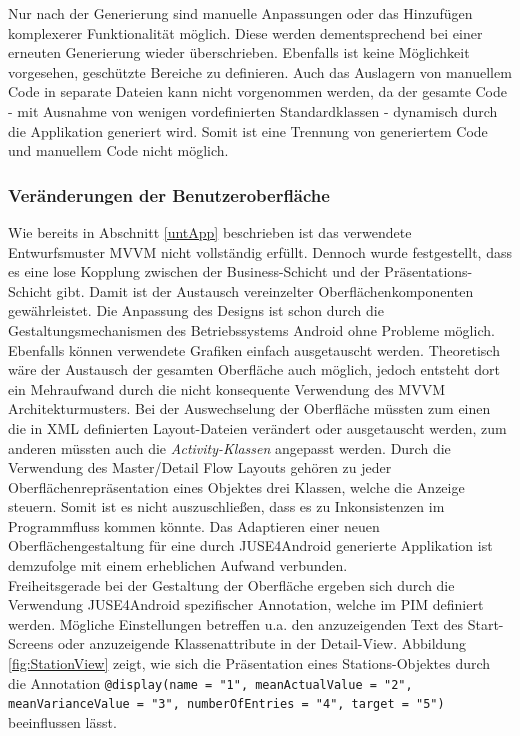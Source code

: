 \documentclass[a4paper,twoside]{article}
\begin{document}
Nur nach der Generierung sind manuelle Anpassungen oder das Hinzufügen komplexerer Funktionalität möglich. Diese werden dementsprechend bei einer erneuten Generierung wieder überschrieben. Ebenfalls ist keine Möglichkeit vorgesehen, geschützte Bereiche zu definieren. Auch das Auslagern von manuellem Code in separate Dateien kann nicht vorgenommen werden, da der gesamte Code - mit Ausnahme von wenigen vordefinierten Standardklassen - dynamisch durch die Applikation generiert wird. Somit ist eine Trennung von generiertem Code und manuellem Code nicht möglich. 

\subsubsection{Veränderungen der Benutzeroberfläche}
Wie bereits in Abschnitt \ref{untApp} beschrieben ist das verwendete Entwurfsmuster MVVM nicht vollständig erfüllt. Dennoch wurde festgestellt, dass es eine lose Kopplung zwischen der Business-Schicht und der Präsentations-Schicht gibt. Damit ist der Austausch vereinzelter Oberflächenkomponenten gewährleistet. Die Anpassung des Designs ist schon durch die Gestaltungsmechanismen des Betriebssystems Android ohne Probleme möglich. Ebenfalls können verwendete Grafiken einfach ausgetauscht werden. Theoretisch wäre der Austausch der gesamten Oberfläche auch möglich, jedoch entsteht dort ein Mehraufwand durch die nicht konsequente Verwendung des MVVM Architekturmusters. Bei der Auswechselung der Oberfläche müssten zum einen die in XML definierten Layout-Dateien verändert oder ausgetauscht werden, zum anderen müssten auch die \textit{Activity-Klassen} angepasst werden. Durch die Verwendung des Master/Detail Flow Layouts gehören zu jeder Oberflächenrepräsentation eines Objektes drei Klassen, welche die Anzeige steuern. Somit ist es nicht auszuschließen, dass es zu Inkonsistenzen im Programmfluss kommen könnte. Das Adaptieren einer neuen Oberflächengestaltung für eine durch JUSE4Android generierte Applikation ist demzufolge mit einem erheblichen Aufwand verbunden.\\
Freiheitsgerade bei der Gestaltung der Oberfläche ergeben sich durch die Verwendung JUSE4Android spezifischer Annotation, welche im PIM definiert werden. Mögliche Einstellungen betreffen u.a. den anzuzeigenden Text des Start-Screens oder anzuzeigende Klassenattribute in der Detail-View. \cite[S.19]{SilvaMasterThesis} Abbildung \ref{fig:StationView} zeigt, wie sich die Präsentation eines Stations-Objektes durch die Annotation \texttt{@display(name = "1", meanActualValue = "2", meanVarianceValue = "3", numberOfEntries = "4", target = "5")} beeinflussen lässt. 
\end{document}
